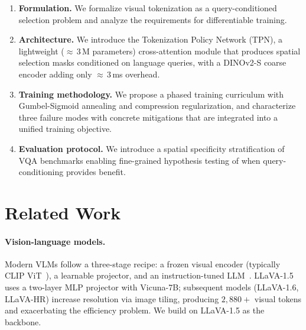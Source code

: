 \documentclass[11pt,a4paper]{article}
\begin{document}
\begin{enumerate}[leftmargin=2em, itemsep=2pt]
  \item \textbf{Formulation.} We formalize visual tokenization as a
    query-conditioned selection problem and analyze the requirements for
    differentiable training.

  \item \textbf{Architecture.} We introduce the Tokenization Policy Network
    (TPN), a lightweight (${\approx}\,3$\,M parameters) cross-attention module
    that produces spatial selection masks conditioned on language queries, with a
    DINOv2-S coarse encoder adding only ${\approx}\,3$\,ms overhead.

  \item \textbf{Training methodology.} We propose a phased training curriculum
    with Gumbel-Sigmoid annealing and compression regularization, and
    characterize three failure modes with concrete mitigations that are
    integrated into a unified training objective.

  \item \textbf{Evaluation protocol.} We introduce a spatial specificity
    stratification of VQA benchmarks enabling fine-grained hypothesis testing of
    when query-conditioning provides benefit.
\end{enumerate}

\section{Related Work}
\label{sec:related}

\paragraph{Vision-language models.}
Modern VLMs follow a three-stage recipe: a frozen visual encoder (typically
CLIP ViT~\citep{radford2021learning}), a learnable projector, and an
instruction-tuned LLM~\citep{liu2024llava,li2023blip2,bai2023qwenvl}.
LLaVA-1.5~\citep{liu2024llava} uses a two-layer MLP projector with Vicuna-7B;
subsequent models (LLaVA-1.6, LLaVA-HR) increase resolution via image tiling,
producing $2{,}880{+}$ visual tokens and exacerbating the efficiency problem.
We build on LLaVA-1.5 as the backbone.
\end{document}
